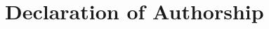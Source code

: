 \documentclass[english, a4paper, 12pt, titlepage, draft]{article}
\begin{document}
\section{Declaration of Authorship}









\pagebreak

\singlespacing
\small



 
\end{document}
